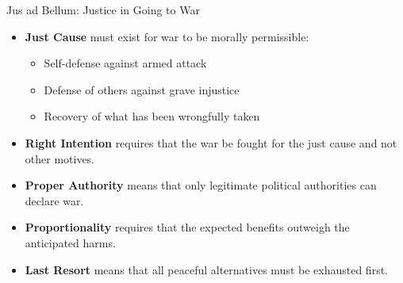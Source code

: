 \documentclass{beamer}
\begin{document}
\begin{frame}{Jus ad Bellum: Justice in Going to War}
    \begin{itemize}
        \item \textbf{Just Cause} must exist for war to be morally permissible:
        \begin{itemize}
            \item Self-defense against armed attack
            \item Defense of others against grave injustice
            \item Recovery of what has been wrongfully taken
        \end{itemize}
        
        \item \textbf{Right Intention} requires that the war be fought for the just cause and not other motives.
        
        \item \textbf{Proper Authority} means that only legitimate political authorities can declare war.
        
        \item \textbf{Proportionality} requires that the expected benefits outweigh the anticipated harms.
        
        \item \textbf{Last Resort} means that all peaceful alternatives must be exhausted first.
    \end{itemize}
\end{frame}
\end{document}
